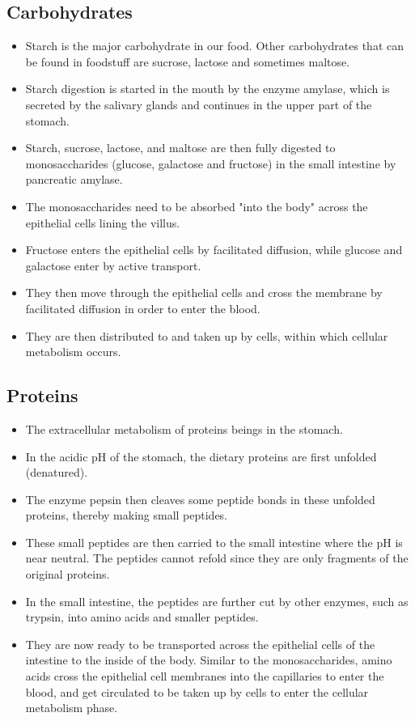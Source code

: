 \documentclass[11pt]{article}
\begin{document}
\subsection{Carbohydrates}
\label{sec:org393d963}
\begin{itemize}
\item Starch is the major carbohydrate in our food. Other carbohydrates that can be found in foodstuff are sucrose, lactose and sometimes maltose.
\item Starch digestion is started in the mouth by the enzyme amylase, which is secreted by the salivary glands and continues in the upper part of the stomach.
\item Starch, sucrose, lactose, and maltose are then fully digested to monosaccharides (glucose, galactose and fructose) in the small intestine by pancreatic amylase.
\item The monosaccharides need to be absorbed "into the body" across the epithelial cells lining the villus.
\item Fructose enters the epithelial cells by facilitated diffusion, while glucose and galactose enter by active transport.
\item They then move through the epithelial cells and cross the membrane by facilitated diffusion in order to enter the blood.
\item They are then distributed to and taken up by cells, within which cellular metabolism occurs.
\end{itemize}

\newpage
\subsection{Proteins}
\label{sec:orgd47c141}
\begin{itemize}
\item The extracellular metabolism of proteins beings in the stomach.
\item In the acidic pH of the stomach, the dietary proteins are first unfolded (denatured).
\item The enzyme pepsin then cleaves some peptide bonds in these unfolded proteins, thereby making small peptides.
\item These small peptides are then carried to the small intestine where the pH is near neutral. The peptides cannot refold since they are only fragments of the original proteins.
\item In the small intestine, the peptides are further cut by other enzymes, such as trypsin, into amino acids and smaller peptides.
\item They are now ready to be transported across the epithelial cells of the intestine to the inside of the body. Similar to the monosaccharides, amino acids cross the epithelial cell membranes into the capillaries to enter the blood, and get circulated to be taken up by cells to enter the cellular metabolism phase.
\end{itemize}
\end{document}
